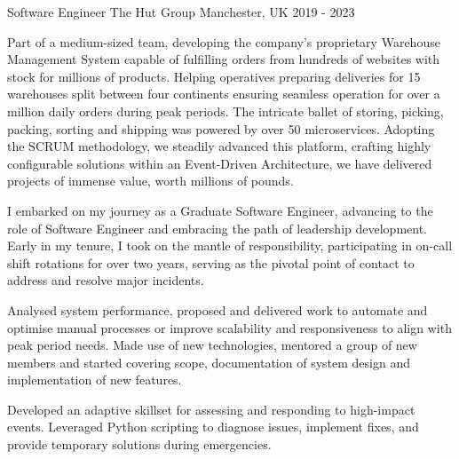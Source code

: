 \cventry
{Software Engineer} %
{The Hut Group} %
{Manchester, UK} %
{2019 - 2023} %
{\begin{cvitems}
     \item{Part of a medium-sized team, developing the company's proprietary Warehouse Management System
     capable of fulfilling orders from hundreds of websites with stock for millions of products. Helping operatives preparing deliveries
     for 15 warehouses split between four continents ensuring seamless operation for over a million daily orders
     during peak periods. The intricate ballet of storing, picking, packing, sorting and shipping was powered by
     over 50 microservices. Adopting the SCRUM methodology, we steadily advanced this platform, crafting highly
     configurable solutions within an Event-Driven Architecture, we have delivered projects of immense value, worth
     millions of pounds.}
     \item{I embarked on my journey as a Graduate Software Engineer, advancing to the role of Software Engineer and
     embracing the path of leadership development. Early in my tenure, I took on the mantle of responsibility,
     participating in on-call shift rotations for over two years, serving as the pivotal point of contact to address and
     resolve major incidents.}
     \item{Analysed system performance, proposed and delivered work to automate and optimise manual
     processes or improve scalability and responsiveness to align with peak period needs. Made use of
     new technologies, mentored a group of new members and started covering scope, documentation of system
     design and implementation of new features.}
     \item{Developed an adaptive skillset for assessing and responding to high-impact events. Leveraged Python scripting
     to diagnose issues, implement fixes, and provide temporary solutions during emergencies.}
\end{cvitems}}